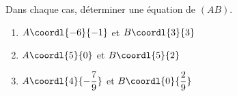 \begin{exo}{}
	Dans chaque cas, déterminer une équation de $(AB)$.
	\begin{enumerate}
		\item $A\coordl{-6}{-1}$ et $B\coordl{3}{3}$
		\item $A\coordl{5}{0}$ et $B\coordl{5}{2}$
		\item $A\coordl{4}{-\dfrac{7}{9}}$ et $B\coordl{0}{\dfrac{2}{9}}$
	\end{enumerate}
\end{exo}
